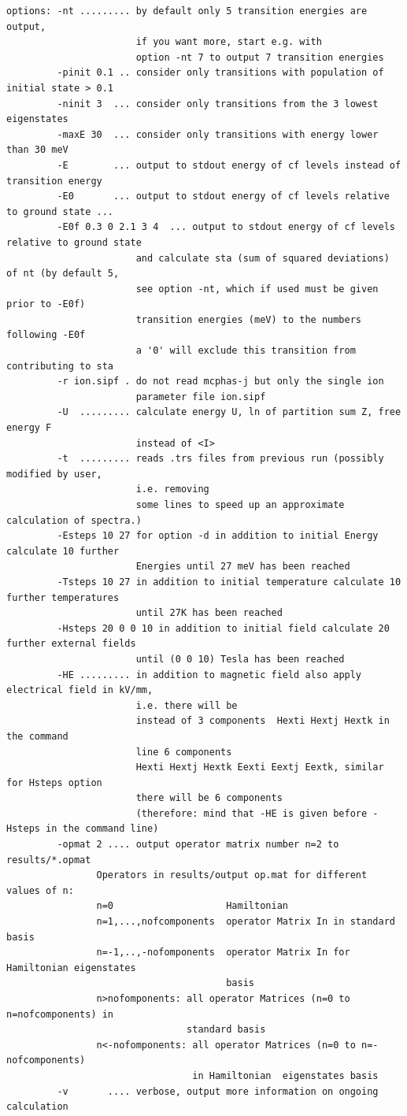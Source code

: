 \begin{description}
\begin{verbatim}
options: -nt ......... by default only 5 transition energies are output,
                       if you want more, start e.g. with 
                       option -nt 7 to output 7 transition energies
         -pinit 0.1 .. consider only transitions with population of initial state > 0.1
         -ninit 3  ... consider only transitions from the 3 lowest eigenstates
         -maxE 30  ... consider only transitions with energy lower than 30 meV
         -E        ... output to stdout energy of cf levels instead of transition energy
         -E0       ... output to stdout energy of cf levels relative to ground state ...
         -E0f 0.3 0 2.1 3 4  ... output to stdout energy of cf levels relative to ground state 
                       and calculate sta (sum of squared deviations) of nt (by default 5,
                       see option -nt, which if used must be given prior to -E0f) 
                       transition energies (meV) to the numbers following -E0f 
                       a '0' will exclude this transition from contributing to sta
         -r ion.sipf . do not read mcphas-j but only the single ion
                       parameter file ion.sipf
         -U  ......... calculate energy U, ln of partition sum Z, free energy F
                       instead of <I>
         -t  ......... reads .trs files from previous run (possibly modified by user, 
                       i.e. removing
                       some lines to speed up an approximate calculation of spectra.)
         -Esteps 10 27 for option -d in addition to initial Energy calculate 10 further
                       Energies until 27 meV has been reached
         -Tsteps 10 27 in addition to initial temperature calculate 10 further temperatures
                       until 27K has been reached
         -Hsteps 20 0 0 10 in addition to initial field calculate 20 further external fields
                       until (0 0 10) Tesla has been reached
         -HE ......... in addition to magnetic field also apply electrical field in kV/mm, 
                       i.e. there will be 
                       instead of 3 components  Hexti Hextj Hextk in the command 
                       line 6 components 
                       Hexti Hextj Hextk Eexti Eextj Eextk, similar for Hsteps option 
                       there will be 6 components
                       (therefore: mind that -HE is given before -Hsteps in the command line)
         -opmat 2 .... output operator matrix number n=2 to results/*.opmat
                Operators in results/output op.mat for different values of n:
                n=0                    Hamiltonian
                n=1,...,nofcomponents  operator Matrix In in standard basis
                n=-1,..,-nofomponents  operator Matrix In for Hamiltonian eigenstates 
                                       basis
                n>nofomponents: all operator Matrices (n=0 to n=nofcomponents) in 
                                standard basis
                n<-nofomponents: all operator Matrices (n=0 to n=-nofcomponents) 
                                 in Hamiltonian  eigenstates basis
         -v       .... verbose, output more information on ongoing calculation


\end{verbatim}
\end{description}

